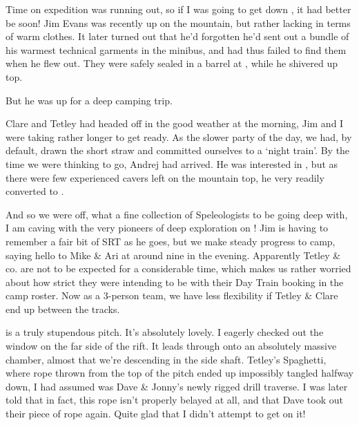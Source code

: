 Time on expedition was running out, so if I was going to get down
, it had better be soon! Jim Evans was
recently up on the mountain, but rather lacking in terms of warm
clothes. It later turned out that he'd forgotten he'd sent out a bundle
of his warmest technical garments in the minibus, and had thus failed to
find them when he flew out. They were safely sealed in a barrel at
, while he shivered up top.

But he was up for a deep camping trip.

Clare and Tetley had headed off in the good weather at the morning, Jim
and I were taking rather longer to get ready. As the slower party of the
day, we had, by default, drawn the short straw and committed ourselves
to a `night train'. By the time we were thinking to go, Andrej had
arrived. He was interested in , but as there were few
experienced cavers left on the mountain top, he very readily converted
to .

And so we were off, what a fine collection of Speleologists to be going
deep with, I am caving with the very pioneers of deep exploration on
! Jim is having to remember a fair bit of SRT as he goes, but we
make steady progress to camp, saying hello to Mike \& Ari at around nine
in the evening. Apparently Tetley \& co. are not to be expected for a
considerable time, which makes us rather worried about how strict they
were intending to be with their Day Train booking in the camp roster.
Now as a 3-person team, we have less flexibility if Tetley \& Clare end
up between the tracks.


 is a truly stupendous pitch. It's absolutely lovely. I eagerly
checked out the window on the far side of the rift. It leads through
onto an absolutely massive chamber, almost that we're descending in the
side shaft. Tetley's Spaghetti, where rope thrown from the top of the
pitch ended up impossibly tangled halfway down, I had assumed was Dave
\& Jonny's newly rigged drill traverse. I was later told that in fact,
this rope isn't properly belayed at all, and that Dave took out their
piece of rope again. Quite glad that I didn't attempt to get on it!

